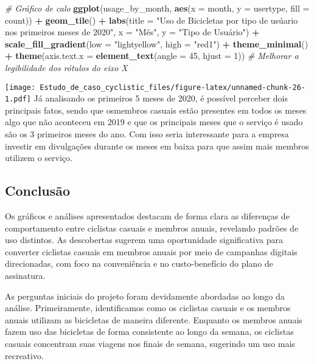 \documentclass[
]{article}
\newenvironment{Shaded}{\begin{snugshade}}{\end{snugshade}}
\newcommand{\AttributeTok}[1]{\textcolor[rgb]{0.13,0.29,0.53}{#1}}
\newcommand{\CommentTok}[1]{\textcolor[rgb]{0.56,0.35,0.01}{\textit{#1}}}
\newcommand{\DecValTok}[1]{\textcolor[rgb]{0.00,0.00,0.81}{#1}}
\newcommand{\FunctionTok}[1]{\textcolor[rgb]{0.13,0.29,0.53}{\textbf{#1}}}
\newcommand{\NormalTok}[1]{#1}
\newcommand{\SpecialCharTok}[1]{\textcolor[rgb]{0.81,0.36,0.00}{\textbf{#1}}}
\newcommand{\StringTok}[1]{\textcolor[rgb]{0.31,0.60,0.02}{#1}}
\begin{document}
\begin{Shaded}
\begin{Highlighting}[]
\CommentTok{\# Gráfico de calo}
\FunctionTok{ggplot}\NormalTok{(usage\_by\_month, }\FunctionTok{aes}\NormalTok{(}\AttributeTok{x =}\NormalTok{ month, }\AttributeTok{y =}\NormalTok{ usertype, }\AttributeTok{fill =}\NormalTok{ count)) }\SpecialCharTok{+}
  \FunctionTok{geom\_tile}\NormalTok{() }\SpecialCharTok{+}
  \FunctionTok{labs}\NormalTok{(}\AttributeTok{title =} \StringTok{"Uso de Bicicletas por tipo de usúario nos primeiros meses de 2020"}\NormalTok{, }
       \AttributeTok{x =} \StringTok{"Mês"}\NormalTok{, }
       \AttributeTok{y =} \StringTok{"Tipo de Usuário"}\NormalTok{) }\SpecialCharTok{+}
  \FunctionTok{scale\_fill\_gradient}\NormalTok{(}\AttributeTok{low =} \StringTok{"lightyellow"}\NormalTok{, }\AttributeTok{high =} \StringTok{"red1"}\NormalTok{) }\SpecialCharTok{+}
  \FunctionTok{theme\_minimal}\NormalTok{() }\SpecialCharTok{+}
  \FunctionTok{theme}\NormalTok{(}\AttributeTok{axis.text.x =} \FunctionTok{element\_text}\NormalTok{(}\AttributeTok{angle =} \DecValTok{45}\NormalTok{, }\AttributeTok{hjust =} \DecValTok{1}\NormalTok{))  }\CommentTok{\# Melhorar a legibilidade dos rótulos do eixo X}
\end{Highlighting}
\end{Shaded}

\texttt{[image: Estudo\_de\_caso\_cyclistic\_files/figure-latex/unnamed-chunk-26-1.pdf]}
Já analisando os primeiros 5 meses de 2020, é possível perceber dois
principais fatos, sendo que osmembros casuais estão presentes em todos
os meses algo que não aconteceu em 2019 e que os principais meses que o
serviço é usado são os 3 primeiros meses do ano. Com isso seria
interessante para a empresa investir em divulgações durante os meses em
baixa para que assim mais membros utilizem o serviço.

\subsection{Conclusão}\label{conclusuxe3o}

Os gráficos e análises apresentados destacam de forma clara as
diferenças de comportamento entre ciclistas casuais e membros anuais,
revelando padrões de uso distintos. As descobertas sugerem uma
oportunidade significativa para converter ciclistas casuais em membros
anuais por meio de campanhas digitais direcionadas, com foco na
conveniência e no custo-benefício do plano de assinatura.

As perguntas iniciais do projeto foram devidamente abordadas ao longo da
análise. Primeiramente, identificamos como os ciclistas casuais e os
membros anuais utilizam as bicicletas de maneira diferente. Enquanto os
membros anuais fazem uso das bicicletas de forma consistente ao longo da
semana, os ciclistas casuais concentram suas viagens nos finais de
semana, sugerindo um uso mais recreativo.
\end{document}
